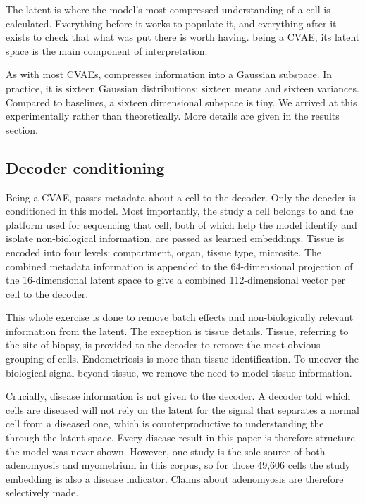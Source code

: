 The latent is where the model's most compressed understanding of a cell 
is calculated. Everything before it works to populate it, and everything 
after it exists to check that what was put there is worth having. \elaj 
being a CVAE, its latent space is the main component of interpretation.

As with most CVAEs, \elaj compresses information into a Gaussian subspace. 
In practice, it is sixteen Gaussian distributions: sixteen means and 
sixteen variances. Compared to baselines, a sixteen dimensional subspace 
is tiny. We arrived at this experimentally rather than theoretically. More 
details are given in the results section.


\subsection*{Decoder conditioning}

Being a CVAE, \elaj passes metadata about a cell to the decoder. Only the 
deocder is conditioned in this model. Most importantly, the study a cell 
belongs to and the platform used for sequencing that cell, both of which 
help the model identify and isolate non-biological information, are 
passed as learned embeddings. Tissue is encoded into four levels: 
compartment, organ, tissue type, microsite. The combined metadata 
information is appended to the 64-dimensional projection of the 
16-dimensional latent space to give a combined 112-dimensional vector 
per cell to the decoder.

This whole exercise is done to remove batch effects and non-biologically 
relevant information from the latent. The exception is tissue details.
Tissue, referring to the site of biopsy, is provided to the decoder to 
remove the most obvious grouping of cells. Endometriosis is more than 
tissue identification. To uncover the biological signal beyond tissue, 
we remove the need to model tissue information.

Crucially, disease information is not given to the decoder. A decoder 
told which cells are diseased will not rely on the latent for the signal 
that separates a normal cell from a diseased one, which is 
counterproductive to understanding the through the latent space. Every 
disease result in this paper is therefore structure the model was never 
shown. However, one study is the sole source of both adenomyosis and 
myometrium in this corpus, so for those 49{,}606 cells the study 
embedding is also a disease indicator. Claims about adenomyosis are 
therefore selectively made.

